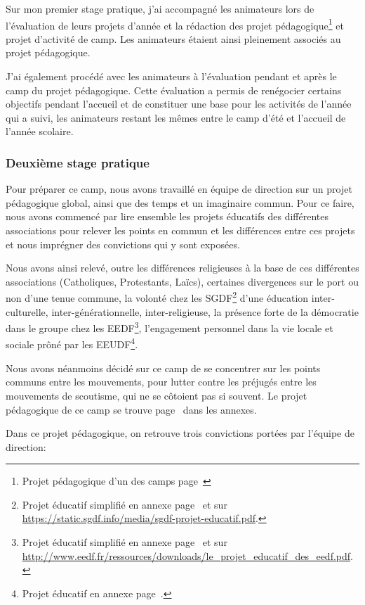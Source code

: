 \documentclass[titlepage,11pt,a4paper]{article}
\begin{document}
Sur mon premier stage pratique, j'ai accompagné les animateurs lors de l'évaluation de
leurs projets d'année et la rédaction des projet pédagogique\footnote{Projet pédagogique
d'un des camps page~\pageref{projetpedmarins}} et projet d'activité de
camp. Les animateurs étaient ainsi pleinement associés au projet pédagogique.

J'ai également procédé avec les animateurs à l'évaluation pendant et après le camp du
projet pédagogique. Cette évaluation a permis de renégocier certains objectifs pendant
l'accueil et de constituer une base pour les activités de l'année qui a suivi, les
animateurs restant les mêmes entre le camp d'été et l'accueil de l'année scolaire.

\subsubsection{Deuxième stage pratique}

Pour préparer ce camp, nous avons travaillé en équipe de direction sur un projet
pédagogique global, ainsi que des temps et un imaginaire commun. Pour ce faire, nous avons
commencé par lire ensemble les projets éducatifs des différentes associations pour relever
les points en commun et les différences entre ces projets et nous imprégner des
convictions qui y sont exposées.

Nous avons ainsi relevé, outre les différences religieuses à la base de ces différentes
associations (Catholiques, Protestants, Laïcs), certaines divergences sur
le port ou non d'une tenue commune, la volonté chez les SGDF\footnote{Projet éducatif simplifié en
annexe page~\pageref{pesgdf} et sur \url{https://static.sgdf.info/media/sgdf-projet-educatif.pdf}.}
d'une éducation inter-culturelle, inter-générationnelle, inter-religieuse, la présence forte de la
démocratie dans le groupe chez les EEDF\footnote{Projet éducatif simplifié en annexe page~\pageref{peeedf} et sur
\url{http://www.eedf.fr/ressources/downloads/le_projet_educatif_des_eedf.pdf}.}, l'engagement personnel dans la vie locale et
sociale prôné par les EEUDF\footnote{Projet éducatif en annexe page~\pageref{peeeudf}.}.

Nous avons néanmoins décidé sur ce camp de se concentrer sur les points communs entre les
mouvements, pour lutter contre les préjugés entre les mouvements de scoutisme, qui ne se
côtoient pas si souvent. Le projet pédagogique de ce camp se trouve page~\pageref{projped}
dans les annexes.

Dans ce projet pédagogique, on retrouve trois convictions portées par l'équipe de direction:
\end{document}
